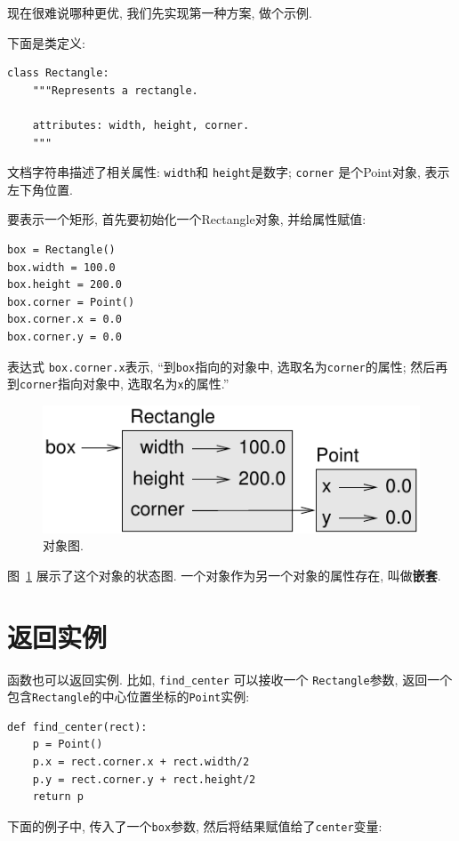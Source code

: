 \documentclass[10pt]{book}
\begin{document}
现在很难说哪种更优, 我们先实现第一种方案, 做个示例. 

下面是类定义:

\begin{verbatim}
class Rectangle:
    """Represents a rectangle. 

    attributes: width, height, corner.
    """
\end{verbatim}
%
文档字符串描述了相关属性: {\tt width}和
{\tt height}是数字; {\tt corner} 是个Point对象, 表示左下角位置. 

要表示一个矩形, 首先要初始化一个Rectangle对象, 并给属性赋值:

\begin{verbatim}
box = Rectangle()
box.width = 100.0
box.height = 200.0
box.corner = Point()
box.corner.x = 0.0
box.corner.y = 0.0
\end{verbatim}
%

表达式 {\tt box.corner.x}表示, 
``到{\tt box}指向的对象中, 选取名为{\tt corner}的属性;
然后再到{\tt corner}指向对象中, 选取名为{\tt x}的属性.''

\begin{figure}
\centerline
{\includegraphics[scale=0.8]{figs/rectangle.pdf}}
\caption{对象图.}
\label{fig.rectangle}
\end{figure}


图~\ref{fig.rectangle} 展示了这个对象的状态图. 
一个对象作为另一个对象的属性存在, 叫做{\bf 嵌套}. 


\section{返回实例}

函数也可以返回实例. 比如, \verb"find_center" 可以接收一个
 {\tt Rectangle}参数, 返回一个包含{\tt Rectangle}的中心位置坐标的{\tt Point}实例:

\begin{verbatim}
def find_center(rect):
    p = Point()
    p.x = rect.corner.x + rect.width/2
    p.y = rect.corner.y + rect.height/2
    return p
\end{verbatim}
%
下面的例子中, 传入了一个{\tt box}参数, 
然后将结果赋值给了{\tt center}变量:
\end{document}
